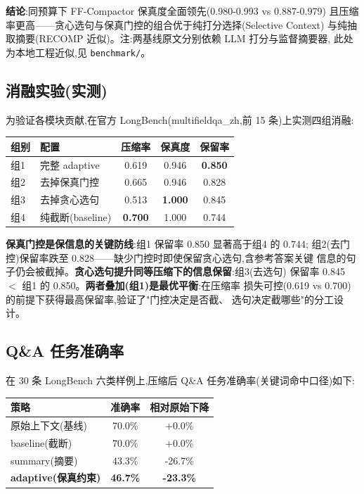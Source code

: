 \documentclass[11pt,a4paper]{article}
\begin{document}
\textbf{结论}:同预算下 FF-Compactor 保真度全面领先(0.980-0.993 vs 0.887-0.979)
且压缩率更高——贪心选句与保真门控的组合优于纯打分选择(Selective Context)
与纯抽取摘要(RECOMP 近似)。注:两基线原文分别依赖 LLM 打分与监督摘要器,
此处为本地工程近似,见 \texttt{benchmark/}。

\subsection{消融实验(实测)}

为验证各模块贡献,在官方 LongBench(multifieldqa\_zh,前 15 条)上实测四组消融:

\begin{table}[h]
  \centering
  \begin{tabular}{@{}llccc@{}}
    \toprule
    组别 & 配置 & 压缩率 & 保真度 & 保留率 \\
    \midrule
    组1 & 完整 adaptive & 0.619 & 0.946 & \textbf{0.850} \\
    组2 & 去掉保真门控 & 0.665 & 0.946 & 0.828 \\
    组3 & 去掉贪心选句 & 0.513 & \textbf{1.000} & 0.845 \\
    组4 & 纯截断(baseline) & \textbf{0.700} & 1.000 & 0.744 \\
    \bottomrule
  \end{tabular}
\end{table}

\textbf{保真门控是保信息的关键防线}:组1 保留率 0.850 显著高于组4 的 0.744;
组2(去门控)保留率跌至 0.828——缺少门控时即使保留贪心选句,含参考答案关键
信息的句子仍会被截掉。\textbf{贪心选句提升同等压缩下的信息保留}:组3(去选句)
保留率 0.845 $<$ 组1 的 0.850。\textbf{两者叠加(组1)是最优平衡}:在压缩率
损失可控(0.619 vs 0.700)的前提下获得最高保留率,验证了"门控决定是否截、
选句决定截哪些"的分工设计。

\subsection{Q\&A 任务准确率}

在 30 条 LongBench 六类样例上,压缩后 Q\&A 任务准确率(关键词命中口径)如下:

\begin{table}[h]
  \centering
  \begin{tabular}{@{}lcc@{}}
    \toprule
    策略 & 准确率 & 相对原始下降 \\
    \midrule
    原始上下文(基线) & 70.0\% & +0.0\% \\
    baseline(截断) & 70.0\% & +0.0\% \\
    summary(摘要) & 43.3\% & -26.7\% \\
    \textbf{adaptive(保真约束)} & \textbf{46.7\%} & \textbf{-23.3\%} \\
    \bottomrule
  \end{tabular}
\end{table}
\end{document}
